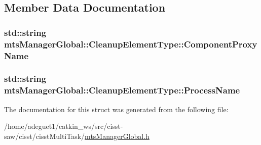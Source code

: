 \subsection{Member Data Documentation}
\hypertarget{structmts_manager_global_1_1_cleanup_element_type_abcd5b7bcbc69b8cc83441b0aaf489820}{
\subsubsection[{Component\-Proxy\-Name}]{\setlength{\rightskip}{0pt plus 5cm}std\-::string mts\-Manager\-Global\-::\-Cleanup\-Element\-Type\-::\-Component\-Proxy\-Name}}\label{structmts_manager_global_1_1_cleanup_element_type_abcd5b7bcbc69b8cc83441b0aaf489820}
\hypertarget{structmts_manager_global_1_1_cleanup_element_type_a0cf55ba12a11d5de8a7f703e5358caca}{
\subsubsection[{Process\-Name}]{\setlength{\rightskip}{0pt plus 5cm}std\-::string mts\-Manager\-Global\-::\-Cleanup\-Element\-Type\-::\-Process\-Name}}\label{structmts_manager_global_1_1_cleanup_element_type_a0cf55ba12a11d5de8a7f703e5358caca}


The documentation for this struct was generated from the following file\-:\begin{DoxyCompactItemize}
\item 
/home/adeguet1/catkin\-\_\-ws/src/cisst-\/saw/cisst/cisst\-Multi\-Task/\hyperlink{mts_manager_global_8h}{mts\-Manager\-Global.\-h}\end{DoxyCompactItemize}
